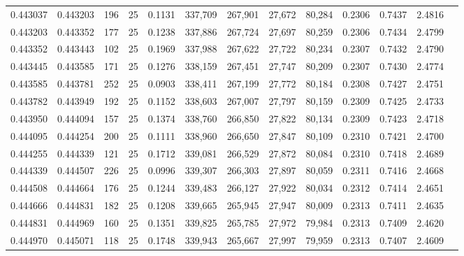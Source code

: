 \begin{tabular}{rrrrrrrrrrrrr}
0.443037 & 0.443203 &   196 &  25 &                                     0.1131 & 337,709 & 267,901 &  27,672 &  80,284 & 0.2306 & 0.7437 & 2.4816 \\
0.443203 & 0.443352 &   177 &  25 &                                     0.1238 & 337,886 & 267,724 &  27,697 &  80,259 & 0.2306 & 0.7434 & 2.4799 \\
0.443352 & 0.443443 &   102 &  25 &                                     0.1969 & 337,988 & 267,622 &  27,722 &  80,234 & 0.2307 & 0.7432 & 2.4790 \\
0.443445 & 0.443585 &   171 &  25 &                                     0.1276 & 338,159 & 267,451 &  27,747 &  80,209 & 0.2307 & 0.7430 & 2.4774 \\
0.443585 & 0.443781 &   252 &  25 &                                     0.0903 & 338,411 & 267,199 &  27,772 &  80,184 & 0.2308 & 0.7427 & 2.4751 \\
0.443782 & 0.443949 &   192 &  25 &                                     0.1152 & 338,603 & 267,007 &  27,797 &  80,159 & 0.2309 & 0.7425 & 2.4733 \\
0.443950 & 0.444094 &   157 &  25 &                                     0.1374 & 338,760 & 266,850 &  27,822 &  80,134 & 0.2309 & 0.7423 & 2.4718 \\
0.444095 & 0.444254 &   200 &  25 &                                     0.1111 & 338,960 & 266,650 &  27,847 &  80,109 & 0.2310 & 0.7421 & 2.4700 \\
0.444255 & 0.444339 &   121 &  25 &                                     0.1712 & 339,081 & 266,529 &  27,872 &  80,084 & 0.2310 & 0.7418 & 2.4689 \\
0.444339 & 0.444507 &   226 &  25 &                                     0.0996 & 339,307 & 266,303 &  27,897 &  80,059 & 0.2311 & 0.7416 & 2.4668 \\
0.444508 & 0.444664 &   176 &  25 &                                     0.1244 & 339,483 & 266,127 &  27,922 &  80,034 & 0.2312 & 0.7414 & 2.4651 \\
0.444666 & 0.444831 &   182 &  25 &                                     0.1208 & 339,665 & 265,945 &  27,947 &  80,009 & 0.2313 & 0.7411 & 2.4635 \\
0.444831 & 0.444969 &   160 &  25 &                                     0.1351 & 339,825 & 265,785 &  27,972 &  79,984 & 0.2313 & 0.7409 & 2.4620 \\
0.444970 & 0.445071 &   118 &  25 &                                     0.1748 & 339,943 & 265,667 &  27,997 &  79,959 & 0.2313 & 0.7407 & 2.4609 \\

\end{tabular}
